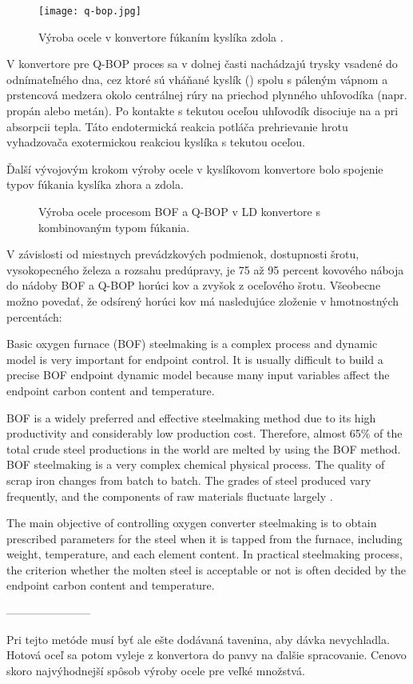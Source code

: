 \begin{figure}
\centering
\texttt{[image: q-bop.jpg]}
\caption{Výroba ocele v konvertore fúkaním kyslíka zdola \citep{Turkdogan1996}.}
\label{o:3}
\end{figure}

V konvertore pre Q-BOP proces sa v dolnej časti nachádzajú trysky vsadené do odnímateľného dna, cez ktoré sú vháňané kyslík () spolu s páleným vápnom a prstencová medzera okolo centrálnej rúry na priechod plynného uhľovodíka (napr. propán alebo metán). Po kontakte s tekutou oceľou uhľovodík disociuje na  a  pri absorpcii tepla. Táto endotermická reakcia potláča prehrievanie hrotu vyhadzovača exotermickou reakciou kyslíka s tekutou oceľou.

Ďalší vývojovým krokom výroby ocele v kyslíkovom konvertore bolo spojenie typov fúkania kyslíka zhora a zdola.


\begin{figure}[!tbp]
\centering
{}
\hfill
{}
\caption{Výroba ocele procesom BOF a Q-BOP v LD konvertore s kombinovaným typom fúkania.}
\label{o:4}
\end{figure}

V závislosti od miestnych prevádzkových podmienok, dostupnosti šrotu, vysokopecného železa a rozsahu predúpravy, je 75 až 95 percent kovového náboja do nádoby BOF a Q-BOP horúci kov a zvyšok z oceľového šrotu. Všeobecne možno povedať, že odsírený horúci kov má nasledujúce zloženie v hmotnostných percentách:



Basic oxygen furnace (BOF) steelmaking is a complex process and dynamic model is very important for endpoint control. It is usually difficult to build a precise BOF endpoint dynamic model because many input variables affect the endpoint carbon content and temperature.


BOF is a widely preferred and effective steelmaking method
due to its high productivity and considerably low production cost. Therefore, almost 65\% of the total crude steel productions in the world are melted by using the BOF method. BOF steelmaking is a very complex chemical physical process. The quality of scrap iron changes from batch to batch. The grades of steel produced vary frequently, and the components of raw materials fluctuate largely \cite{Wang2010}.

The main objective of controlling oxygen converter steelmaking is to obtain prescribed parameters for the steel when it is tapped from the furnace, including weight, temperature, and each element content. In practical steelmaking process, the criterion whether the molten steel is acceptable or not is often decided by the endpoint carbon content and temperature.

-----------------------

Pri tejto metóde musí byť ale ešte dodávaná tavenina, aby dávka nevychladla.
Hotová oceľ sa potom vyleje z konvertora do panvy na ďalšie spracovanie.
Cenovo skoro najvýhodnejší spôsob výroby ocele pre veľké množstvá.
